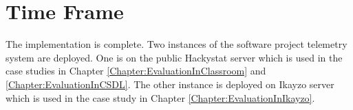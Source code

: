 \section{Time Frame}

The implementation is complete. Two instances of the software project telemetry system are deployed. One is on the public Hackystat server which is used in the case studies in Chapter \ref{Chapter:EvaluationInClassroom} and \ref{Chapter:EvaluationInCSDL}. The other instance is deployed on Ikayzo server which is used in the case study in Chapter \ref{Chapter:EvaluationInIkayzo}.










